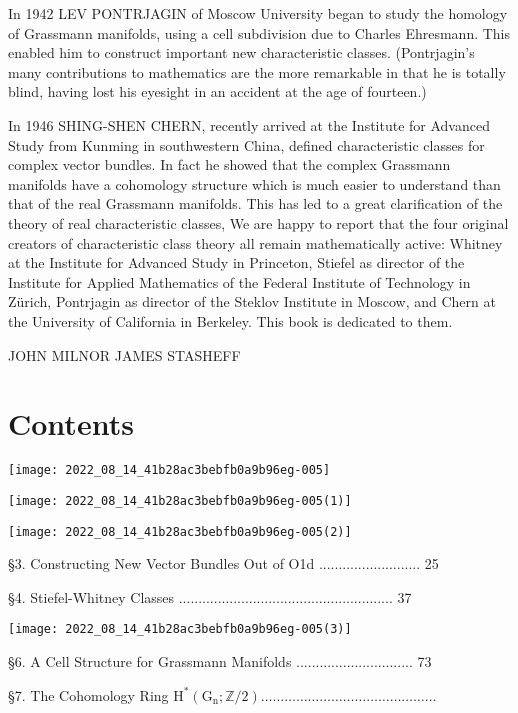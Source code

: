\documentclass[10pt]{article}
\begin{document}
In 1942 LEV PONTRJAGIN of Moscow University began to study the homology of Grassmann manifolds, using a cell subdivision due to Charles Ehresmann. This enabled him to construct important new characteristic classes. (Pontrjagin's many contributions to mathematics are the more remarkable in that he is totally blind, having lost his eyesight in an accident at the age of fourteen.)

In 1946 SHING-SHEN CHERN, recently arrived at the Institute for Advanced Study from Kunming in southwestern China, defined characteristic classes for complex vector bundles. In fact he showed that the complex Grassmann manifolds have a cohomology structure which is much easier to understand than that of the real Grassmann manifolds. This has led to a great clarification of the theory of real characteristic classes, We are happy to report that the four original creators of characteristic class theory all remain mathematically active: Whitney at the Institute for Advanced Study in Princeton, Stiefel as director of the Institute for Applied Mathematics of the Federal Institute of Technology in Zürich, Pontrjagin as director of the Steklov Institute in Moscow, and Chern at the University of California in Berkeley. This book is dedicated to them.

JOHN MILNOR JAMES STASHEFF

\section{Contents}
\texttt{[image: 2022\_08\_14\_41b28ac3bebfb0a9b96eg-005]}

\texttt{[image: 2022\_08\_14\_41b28ac3bebfb0a9b96eg-005(1)]}

\texttt{[image: 2022\_08\_14\_41b28ac3bebfb0a9b96eg-005(2)]}

§3. Constructing New Vector Bundles Out of O1d .......................... 25

§4. Stiefel-Whitney Classes ....................................................... 37

\texttt{[image: 2022\_08\_14\_41b28ac3bebfb0a9b96eg-005(3)]}

§6. A Cell Structure for Grassmann Manifolds .............................. 73

§7. The Cohomology Ring $\mathrm{H}^{*}\left(\mathrm{G}_{\mathrm{n}} ; \mathbb{Z} / 2\right) \ldots \ldots \ldots \ldots \ldots \ldots \ldots \ldots \ldots \ldots \ldots \ldots \ldots \ldots \ldots$
\end{document}
